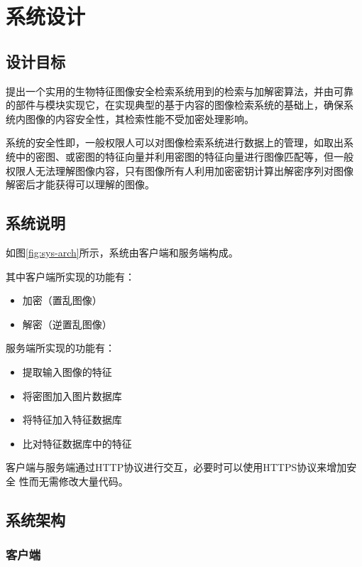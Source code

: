 
\chapter{系统设计}
\label{chap:sys-design}

\section{设计目标}
\label{sec:design-goal}

提出一个实用的生物特征图像安全检索系统用到的检索与加解密算法，并由可靠
的部件与模块实现它，在实现典型的基于内容的图像检索系统的基础上，确保系
统内图像的内容安全性，其检索性能不受加密处理影响。

系统的安全性即，一般权限人可以对图像检索系统进行数据上的管理，如取出系
统中的密图、或密图的特征向量并利用密图的特征向量进行图像匹配等，但一般
权限人无法理解图像内容，只有图像所有人利用加密密钥计算出解密序列对图像
解密后才能获得可以理解的图像。

\section{系统说明}
\label{sec:sys-description}


如图\ref{fig:sys-arch}所示，系统由客户端和服务端构成。

其中客户端所实现的功能有：
\begin{itemize}
\item 加密（置乱图像）
\item 解密（逆置乱图像）
\end{itemize}

服务端所实现的功能有：
\begin{itemize}
\item 提取输入图像的特征
\item 将密图加入图片数据库
\item 将特征加入特征数据库
\item 比对特征数据库中的特征
\end{itemize}

客户端与服务端通过HTTP协议进行交互，必要时可以使用HTTPS协议来增加安全
性而无需修改大量代码。

\section{系统架构}
\label{sec:sys-arch}
\subsection{客户端}

